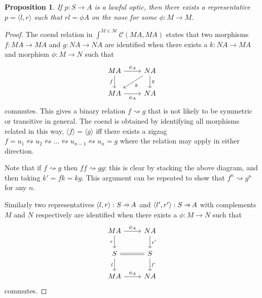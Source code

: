 \documentclass[11pt,a4paper]{article}
\theoremstyle{plain}
\newtheorem{proposition}[theorem]{Proposition}
\theoremstyle{definition}
\newcommand{\C}{\mathscr{C}}
\newcommand{\M}{\mathscr{M}}
\newcommand{\hto}{\ensuremath{\,\mathaccent\shortmid\rightarrow\,}}
\begin{document}
\begin{proposition}
\label{prop-onthenose}
If $p : S \to A$ is a lawful optic, then there exists a representative $p = \langle l, r \rangle$ such that $rl = \phi A$ on the nose for some $\phi : M \to M$.
\end{proposition}
\begin{proof}
The coend relation in $\int^{M \in \M} \C(M A, M A)$ states that two morphisms $f : M A \to M A$ and $g : N A \to N A$ are identified when there exists a $k : N A \to M A$ and morphism $\phi : M \to N$ such that
\[
\begin{tikzcd}
M A \ar[r, "\phi_A"] \ar[d, "f", swap] & N A \ar[d, "g"] \ar[dl, "k"] \\
M A \ar[r, "\phi_A", swap] & N A
\end{tikzcd}
\]
commutes. This gives a binary relation $f \rightsquigarrow g$ that is not likely to be symmetric or transitive in general. The coend is obtained by identifying all morphisms related in this way, $\langle f \rangle = \langle g \rangle$ iff there exists a zigzag $f = u_1 \leftrightsquigarrow u_2 \leftrightsquigarrow \dots  \leftrightsquigarrow u_{n-1} \leftrightsquigarrow u_n = g$ where the relation may apply in either direction.

Note that if $f \rightsquigarrow g$ then $ff \rightsquigarrow gg$: this is clear by stacking the above diagram, and then taking $k' = fk = kg$. This argument can be repeated to show that $f^n \rightsquigarrow g^n$ for any $n$.

Similarly two representatives $\langle l, r \rangle : S \hto A$ and $\langle l', r' \rangle : S \hto A$ with complements $M$ and $N$ respectively are identified when there exists a $\phi : M \to N$ such that
\[
\begin{tikzcd}
M A \ar[r, "\phi_A"] \ar[d, "r", swap] & N A \ar[d, "r'"] \\
S \ar[r, equal] \ar[d, "l", swap] & S \ar[d, "l'"]  \\
MA \ar[r, "\phi_A"] & N A
\end{tikzcd}
\]
commutes. 


\end{proof}
\end{document}
